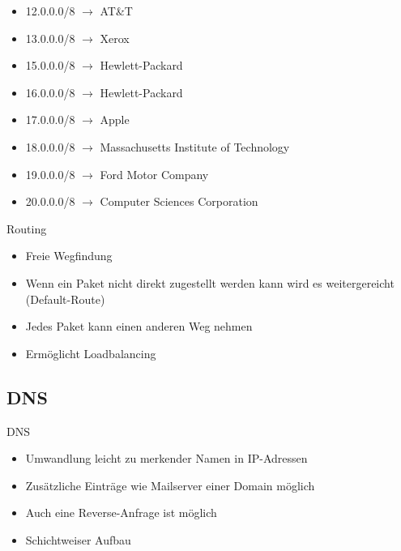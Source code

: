 \documentclass[aspectratio=43]{beamer}
\begin{document}
\begin{frame} 
	\begin{exampleblock}{}
	\begin{itemize}
	\item 12.0.0.0/8 $\rightarrow$ AT\&T
	\item 13.0.0.0/8 $\rightarrow$ Xerox
	\item 15.0.0.0/8 $\rightarrow$ Hewlett-Packard
	\item 16.0.0.0/8 $\rightarrow$ Hewlett-Packard
	\item 17.0.0.0/8 $\rightarrow$ Apple
	\item 18.0.0.0/8 $\rightarrow$ Massachusetts Institute of Technology
	\item 19.0.0.0/8 $\rightarrow$ Ford Motor Company
	\item 20.0.0.0/8 $\rightarrow$ Computer Sciences Corporation
	\end{itemize}
	\end{exampleblock}
\end{frame}


\begin{frame} 

	\begin{block}{Routing}
	\begin{itemize}
	\item Freie Wegfindung
	\item Wenn ein Paket nicht direkt zugestellt werden kann wird es weitergereicht (Default-Route)
	\item Jedes Paket kann einen anderen Weg nehmen
	\item Ermöglicht Loadbalancing
	\end{itemize}
	\end{block}
	
\end{frame}

\subsection{DNS}
\begin{frame} 

	\begin{block}{DNS}
	\begin{itemize}
	\item Umwandlung leicht zu merkender Namen in IP-Adressen
	\item Zusätzliche Einträge wie Mailserver einer Domain möglich
	\item Auch eine Reverse-Anfrage ist möglich
	\item Schichtweiser Aufbau
	\end{itemize}
	\end{block}
	
\end{frame}
\end{document}

